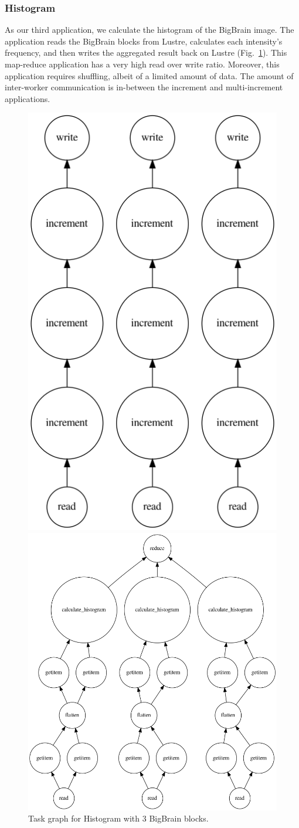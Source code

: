 \documentclass[AMA,STIX1COL]{WileyNJD-v2}
\begin{document}
\subsubsection{Histogram}
As our third application, we calculate the histogram of the BigBrain image. 
The application reads the BigBrain blocks from Lustre, calculates each intensity's frequency, and then writes the aggregated result back on Lustre (Fig.~\ref{fig:graph-histogram}).
This map-reduce application has a very high read over write ratio.
Moreover, this application requires shuffling, albeit of a limited amount of data. 
The amount of inter-worker communication is in-between the increment and multi-increment applications.
				
\begin{figure}[h]
	\centering
	\begin{minipage}{.45\textwidth}
		\centering
		\includegraphics[width=0.45\linewidth]{figures/increment.png}
		\caption{Task graph for Incrementation with 3 iterations and 3 BigBrain blocks.}
		\label{fig:graph-increment}		
	\end{minipage}
	\begin{minipage}{.45\textwidth}
		\centering
		\includegraphics[width=0.45\linewidth]{figures/histogram.png}
		\caption{Task graph for Histogram with 3 BigBrain blocks.}
		\label{fig:graph-histogram}			
	\end{minipage}
\end{figure}
							
\end{document}
